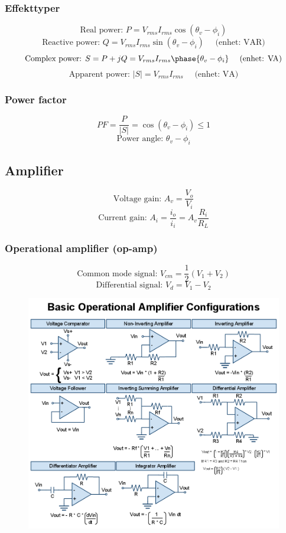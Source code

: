 \documentclass{article}
\begin{document}
\subsubsection{Effekttyper}
\[ \textrm{Real power: } P = V_{rms} I_{rms} \cos(\theta_v - \phi_i) \]
\[ \textrm{Reactive power: } Q = V_{rms} I_{rms}\sin(\theta_v - \phi_i) \quad \textrm{ (enhet: VAR)}\]
\[ \textrm{Complex power: } S = P + jQ = V_{rms}I_{rms}\phase{\theta_v - \phi_i} \quad \textrm{ (enhet: VA)} \]
\[ \textrm{Apparent power: } |S| = V_{rms}I_{rms} \quad \textrm{ (enhet: VA)} \]

\subsubsection{Power factor}
\[ PF = \frac{P}{|S|} = \cos(\theta_v - \phi_i) \leq 1 \]
\[ \textrm{Power angle: } \theta_v - \phi_i \]

\subsection{Amplifier}
\[ \textrm{Voltage gain: } A_v = \frac{V_o}{V_i} \]
\[ \textrm{Current gain: } A_i = \frac{i_o}{i_i} = A_v \frac{R_i}{R_L} \]

\subsubsection{Operational amplifier (op-amp)}
\[ \textrm{Common mode signal: } V_{cm} = \frac{1}{2}(V_1 + V_2) \]
\[ \textrm{Differential signal: } V_d = V_1 - V_2 \]

\begin{figure}[H]
    \centering
        \includegraphics[scale=0.35]{opamps.png}
    \label{fig:opamps}
\end{figure}
\end{document}
